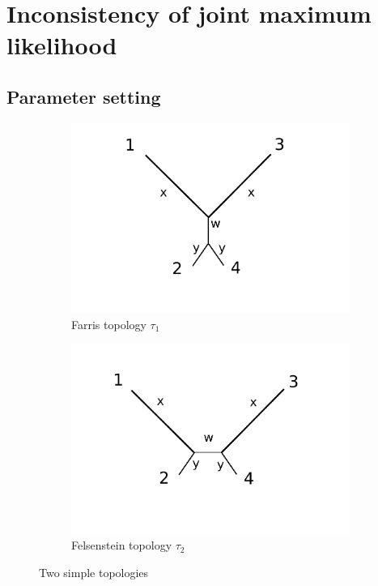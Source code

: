 \documentclass[a4paper]{article}
\begin{document}
\section{Inconsistency of joint maximum likelihood}

\subsection{Parameter setting}

\begin{figure}
\centering
\begin{subfigure}{.45\linewidth}
\centering
\includegraphics[width=.95\textwidth]{farris_blank}
\caption[short]{Farris topology $\tau_1$}
\end{subfigure}
\begin{subfigure}{.45\linewidth}
\centering
\includegraphics[width=.95\textwidth]{felsenstein_blank}
\caption[short]{Felsenstein topology $\tau_2$}
\end{subfigure}
\caption{Two simple topologies}
\label{fig:farris-fels-top}
\end{figure}
\end{document}
